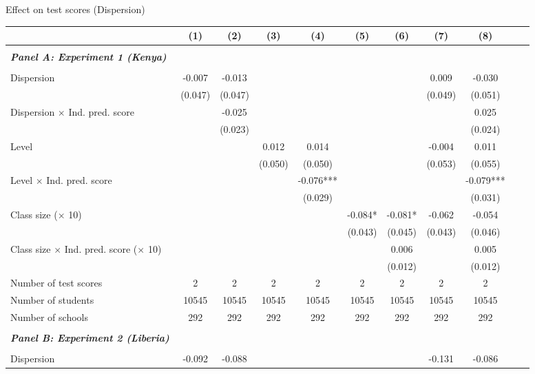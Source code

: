 \begin{center} 
\caption{\small Effect on test scores (Dispersion)} 
\label{tab:descriptives} 
\begin{scriptsize}
\begin{threeparttable}
\begin{tabular} {@{} l l c c c c c c c c c c  @{}} \toprule \toprule
& &(1)&(2)&(3)&(4)&(5)&(6)&(7)&(8) \\ \midrule 
\\
\multicolumn{3}{l}{\textbf{\textit{Panel A: Experiment 1 (Kenya)}}} \\
\\
Dispersion &  & -0.007 & -0.013 &  &  &  &  & 0.009 & -0.030 \\
                 &  & (0.047) & (0.047) &  &  &  &  & (0.049) & (0.051) \\
Dispersion $\times$ Ind. pred. score &  &  & -0.025 &  &  &  &  &  & 0.025 \\
                 &  &  & (0.023) &  &  &  &  &  & (0.024) \\
Level &  &  &  & 0.012 & 0.014 &  &  & -0.004 & 0.011 \\
                 &  &  &  & (0.050) & (0.050) &  &  & (0.053) & (0.055) \\
Level $\times$ Ind. pred. score &  &  &  &  & -0.076*** &  &  &  & -0.079*** \\
                 &  &  &  &  & (0.029) &  &  &  & (0.031) \\
Class size ($\times$ 10) &  &  &  &  &  & -0.084* & -0.081* & -0.062 & -0.054 \\
                 &  &  &  &  &  & (0.043) & (0.045) & (0.043) & (0.046) \\
Class size $\times$ Ind. pred. score ($\times$ 10) &  &  &  &  &  &  & 0.006 &  & 0.005 \\
                 &  &  &  &  &  &  & (0.012) &  & (0.012) \\
\midrule
Number of test scores &  & 2 & 2 & 2 & 2 & 2 & 2 & 2 & 2 \\
Number of students &  & 10545 & 10545 & 10545 & 10545 & 10545 & 10545 & 10545 & 10545 \\
Number of schools &  & 292 & 292 & 292 & 292 & 292 & 292 & 292 & 292 \\
 \midrule
\\
\multicolumn{3}{l}{\textbf{\textit{Panel B: Experiment 2 (Liberia)}}} \\
\\
Dispersion &  & -0.092 & -0.088 &  &  &  &  & -0.131 & -0.086 \\

\end{tabular}
\end{threeparttable}
\end{scriptsize}
\end{center}
